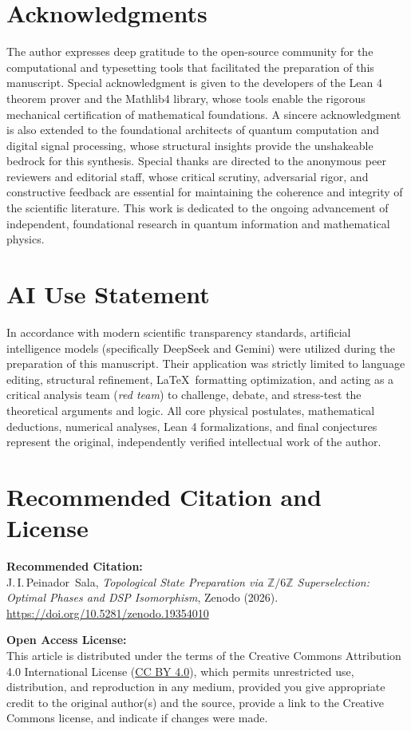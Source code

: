 \documentclass[12pt,a4paper]{article}
\theoremstyle{plain}
\theoremstyle{definition}
\theoremstyle{remark}
\begin{document}
\section*{Acknowledgments}
The author expresses deep gratitude to the open-source community for the computational and typesetting tools that facilitated the preparation of this manuscript. Special acknowledgment is given to the developers of the Lean 4 theorem prover and the Mathlib4 library, whose tools enable the rigorous mechanical certification of mathematical foundations. A sincere acknowledgment is also extended to the foundational architects of quantum computation and digital signal processing, whose structural insights provide the unshakeable bedrock for this synthesis. Special thanks are directed to the anonymous peer reviewers and editorial staff, whose critical scrutiny, adversarial rigor, and constructive feedback are essential for maintaining the coherence and integrity of the scientific literature. This work is dedicated to the ongoing advancement of independent, foundational research in quantum information and mathematical physics.

\section*{AI Use Statement}
In accordance with modern scientific transparency standards, artificial intelligence models (specifically DeepSeek and Gemini) were utilized during the preparation of this manuscript. Their application was strictly limited to language editing, structural refinement, \LaTeX\ formatting optimization, and acting as a critical analysis team (\textit{red team}) to challenge, debate, and stress-test the theoretical arguments and logic. All core physical postulates, mathematical deductions, numerical analyses, Lean 4 formalizations, and final conjectures represent the original, independently verified intellectual work of the author.

\section*{Recommended Citation and License}

\noindent\textbf{Recommended Citation:} \\
J.\,I.\,Peinador~Sala, \emph{Topological State Preparation via \(\mathbb{Z}/6\mathbb{Z}\) Superselection: Optimal Phases and DSP Isomorphism}, Zenodo (2026). \url{https://doi.org/10.5281/zenodo.19354010}

\vspace{1em}
\noindent\textbf{Open Access License:} \\
This article is distributed under the terms of the Creative Commons Attribution 4.0 International License (\href{https://creativecommons.org/licenses/by/4.0/}{CC BY 4.0}), which permits unrestricted use, distribution, and reproduction in any medium, provided you give appropriate credit to the original author(s) and the source, provide a link to the Creative Commons license, and indicate if changes were made.
\end{document}
